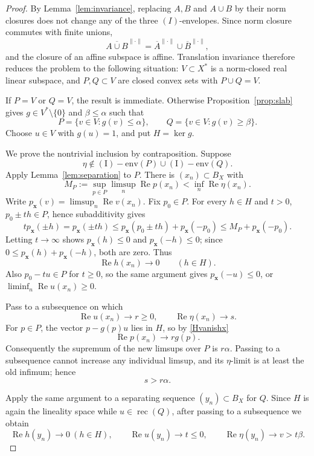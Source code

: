 \documentclass[11pt]{article}
\theoremstyle{remark}
\newcommand{\Ienv}{\operatorname{(I)\!\!-env}}
\newcommand{\Ree}{\operatorname{Re}}
\newcommand{\rec}{\operatorname{rec}}
\begin{document}
\begin{proof}
By Lemma~\ref{lem:invariance}, replacing $A,B$ and $A\cup B$ by their norm
closures does not change any of the three $(I)$-envelopes.  Since norm
closure commutes with finite unions,
\[
 \overline{A\cup B}^{\|\cdot\|}
 =\overline A^{\|\cdot\|}\cup\overline B^{\|\cdot\|},
\]
and the closure of an affine subspace is affine.  Translation invariance
therefore reduces the problem to the following situation: $V\subset X^*$
is a norm-closed real linear subspace, and $P,Q\subset V$ are closed convex
sets with $P\cup Q=V$.

If $P=V$ or $Q=V$, the result is immediate.  Otherwise
Proposition~\ref{prop:slab} gives $g\in V^*\setminus\{0\}$ and
$\beta\leq\alpha$ such that
\[
 P=\{v\in V:g(v)\leq\alpha\},
 \qquad
 Q=\{v\in V:g(v)\geq\beta\}.
\]
Choose $u\in V$ with $g(u)=1$, and put $H=\ker g$.

We prove the nontrivial inclusion by contraposition.  Suppose
\[
 \eta\notin\Ienv(P)\cup\Ienv(Q).
\]
Apply Lemma~\ref{lem:separation} to $P$.  There is $(x_n)\subset B_X$ with
\[
 M_P:=\sup_{p\in P}\limsup_n\Ree p(x_n)
 <\inf_n\Ree\eta(x_n).
\]
Write $p_{\mathbf{x}}(v)=\limsup_n\Ree v(x_n)$.  Fix $p_0\in P$.
For every $h\in H$ and $t>0$, $p_0\pm th\in P$, hence subadditivity gives
\[
 t p_{\mathbf{x}}(\pm h)
 =p_{\mathbf{x}}(\pm th)
 \leq p_{\mathbf{x}}(p_0\pm th)+p_{\mathbf{x}}(-p_0)
 \leq M_P+p_{\mathbf{x}}(-p_0).
\]
Letting $t\to\infty$ shows
$p_{\mathbf{x}}(h)\leq0$ and $p_{\mathbf{x}}(-h)\leq0$; since
$0\leq p_{\mathbf{x}}(h)+p_{\mathbf{x}}(-h)$, both are zero.  Thus
\[
\tag{6.1}\label{Hvanishx}
 \Ree h(x_n)\longrightarrow0\qquad(h\in H).
\]
Also $p_0-tu\in P$ for $t\geq0$, so the same argument gives
$p_{\mathbf{x}}(-u)\leq0$, or
$\liminf_n\Ree u(x_n)\geq0$.

Pass to a subsequence on which
\[
 \Ree u(x_n)\to r\geq0,
 \qquad
 \Ree\eta(x_n)\to s.
\]
For $p\in P$, the vector $p-g(p)u$ lies in $H$, so by
\eqref{Hvanishx}
\[
 \Ree p(x_n)\longrightarrow r g(p).
\]
Consequently the supremum of the new limsups over $P$ is $r\alpha$.  Passing
to a subsequence cannot increase any individual limsup, and its
$\eta$-limit is at least the old infimum; hence
\[
\tag{6.2}\label{ineqP}
 s>r\alpha.
\]

Apply the same argument to a separating sequence $(y_n)\subset B_X$ for
$Q$.  Since $H$ is again the lineality space while $u\in\rec(Q)$, after
passing to a subsequence we obtain
\[
\tag{6.3}\label{limitsQ}
 \Ree h(y_n)\to0\ (h\in H),\qquad
 \Ree u(y_n)\to t\leq0,\qquad
 \Ree\eta(y_n)\to v>t\beta.
\]


\end{proof}
\end{document}
